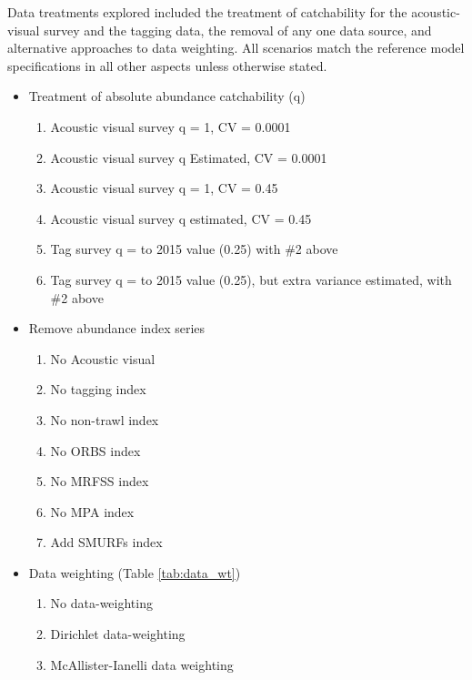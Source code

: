 \documentclass[11pt,
  english,
  letterpaper,
]{article}
\providecommand{\tightlist}{%
  \setlength{\itemsep}{0pt}\setlength{\parskip}{0pt}}
\providecommand{\tightlist}{%
  \setlength{\itemsep}{0pt}\setlength{\parskip}{0pt}}
\begin{document}
Data treatments explored included the treatment of catchability for the acoustic-visual survey and the tagging data, the removal of any one data source, and alternative approaches to data weighting. All scenarios match the reference model specifications in all other aspects unless otherwise stated.

\begin{itemize}
\tightlist
\item
  Treatment of absolute abundance catchability (q)

  \begin{enumerate}
  \def\labelenumi{\arabic{enumi}.}
  \tightlist
  \item
    Acoustic visual survey q = 1, CV = 0.0001
  \item
    Acoustic visual survey q Estimated, CV = 0.0001
  \item
    Acoustic visual survey q = 1, CV = 0.45
  \item
    Acoustic visual survey q estimated, CV = 0.45
  \item
    Tag survey q = to 2015 value (0.25) with \#2 above
  \item
    Tag survey q = to 2015 value (0.25), but extra variance estimated, with \#2 above
  \end{enumerate}
\item
  Remove abundance index series

  \begin{enumerate}
  \def\labelenumi{\arabic{enumi}.}
  \setcounter{enumi}{6}
  \tightlist
  \item
    No Acoustic visual
  \item
    No tagging index
  \item
    No non-trawl index
  \item
    No ORBS index
  \item
    No MRFSS index
  \item
    No MPA index
  \item
    Add SMURFs index
  \end{enumerate}
\item
  Data weighting (Table \ref{tab:data_wt})

  \begin{enumerate}
  \def\labelenumi{\arabic{enumi}.}
  \setcounter{enumi}{13}
  \tightlist
  \item
    No data-weighting
  \item
    Dirichlet data-weighting
  \item
    McAllister-Ianelli data weighting
  \end{enumerate}
\end{itemize}
\end{document}
